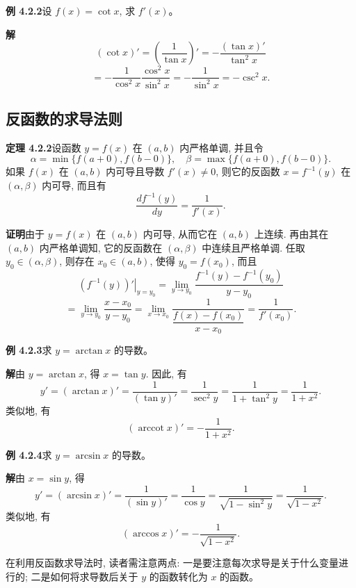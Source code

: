 \documentclass[UTF8, 12pt, fontset=fandol, oneside]{ctexart}
\begin{document}
\noindent\textbf{例 4.2.2}\quad 设 $f(x)=\cot x$, 求 $f'(x)$。

\noindent\textbf{解}\quad
\[
  (\cot x)'=\left(\frac1{\tan x}\right)'
  =
  -\frac{(\tan x)'}{\tan^2 x}
\]
\[
  =
  -\frac1{\cos^2 x}\frac{\cos^2 x}{\sin^2 x}
  =
  -\frac1{\sin^2 x}
  =
  -\operatorname{csc}^2x.
\]

\subsection{反函数的求导法则}

\noindent\textbf{定理 4.2.2}\quad 设函数 $y=f(x)$ 在 $(a,b)$ 内严格单调, 并且令
\[
  \alpha=\min\{f(a+0),f(b-0)\},
  \quad
  \beta=\max\{f(a+0),f(b-0)\}.
\]
如果 $f(x)$ 在 $(a,b)$ 内可导且导数 $f'(x)\ne0$, 则它的反函数 $x=f^{-1}(y)$ 在 $(\alpha,\beta)$ 内可导, 而且有
\[
  \frac{df^{-1}(y)}{dy}=\frac1{f'(x)}.
\]

\noindent\textbf{证明}\quad 由于 $y=f(x)$ 在 $(a,b)$ 内可导, 从而它在 $(a,b)$ 上连续. 再由其在 $(a,b)$ 内严格单调知, 它的反函数在 $(\alpha,\beta)$ 中连续且严格单调. 任取 $y_0\in(\alpha,\beta)$, 则存在 $x_0\in(a,b)$, 使得 $y_0=f(x_0)$, 而且
\[
  \left.(f^{-1}(y))'\right|_{y=y_0}
  =
  \lim_{y\to y_0}\frac{f^{-1}(y)-f^{-1}(y_0)}{y-y_0}
\]
\[
  =
  \lim_{y\to y_0}\frac{x-x_0}{y-y_0}
  =
  \lim_{x\to x_0}
  \frac1{\dfrac{f(x)-f(x_0)}{x-x_0}}
  =
  \frac1{f'(x_0)}.
\]

\noindent\textbf{例 4.2.3}\quad 求 $y=\arctan x$ 的导数。

\noindent\textbf{解}\quad 由 $y=\arctan x$, 得 $x=\tan y$. 因此, 有
\[
  y'=(\arctan x)'=\frac1{(\tan y)'}
  =\frac1{\sec^2 y}
  =\frac1{1+\tan^2 y}
  =\frac1{1+x^2}.
\]
类似地, 有
\[
  (\operatorname{arccot}x)'=-\frac1{1+x^2}.
\]

\noindent\textbf{例 4.2.4}\quad 求 $y=\arcsin x$ 的导数。

\noindent\textbf{解}\quad 由 $x=\sin y$, 得
\[
  y'=(\arcsin x)'=\frac1{(\sin y)'}
  =\frac1{\cos y}
  =\frac1{\sqrt{1-\sin^2y}}
  =\frac1{\sqrt{1-x^2}}.
\]
类似地, 有
\[
  (\arccos x)'=-\frac1{\sqrt{1-x^2}}.
\]

在利用反函数求导法时, 读者需注意两点: 一是要注意每次求导是关于什么变量进行的; 二是如何将求导数后关于 $y$ 的函数转化为 $x$ 的函数。
\end{document}
